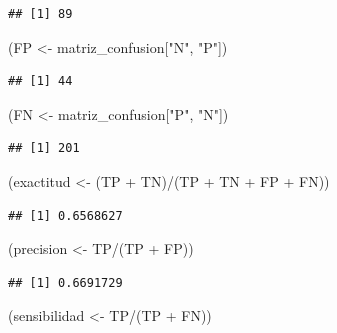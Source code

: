 \documentclass[
  12pt,
]{book}
\newenvironment{Shaded}{\begin{snugshade}}{\end{snugshade}}
\newcommand{\NormalTok}[1]{#1}
\newcommand{\OtherTok}[1]{\textcolor[rgb]{0.56,0.35,0.01}{#1}}
\newcommand{\SpecialCharTok}[1]{\textcolor[rgb]{0.00,0.00,0.00}{#1}}
\newcommand{\StringTok}[1]{\textcolor[rgb]{0.31,0.60,0.02}{#1}}
\theoremstyle{definition}
\theoremstyle{definition}
\theoremstyle{definition}
\theoremstyle{remark}
\begin{document}
\begin{verbatim}
## [1] 89
\end{verbatim}

\begin{Shaded}
\begin{Highlighting}[]
\NormalTok{(FP }\OtherTok{\textless{}{-}}\NormalTok{ matriz\_confusion[}\StringTok{"N"}\NormalTok{, }\StringTok{"P"}\NormalTok{])}
\end{Highlighting}
\end{Shaded}

\begin{verbatim}
## [1] 44
\end{verbatim}

\begin{Shaded}
\begin{Highlighting}[]
\NormalTok{(FN }\OtherTok{\textless{}{-}}\NormalTok{ matriz\_confusion[}\StringTok{"P"}\NormalTok{, }\StringTok{"N"}\NormalTok{])}
\end{Highlighting}
\end{Shaded}

\begin{verbatim}
## [1] 201
\end{verbatim}

\begin{Shaded}
\begin{Highlighting}[]
\NormalTok{(exactitud }\OtherTok{\textless{}{-}}\NormalTok{ (TP }\SpecialCharTok{+}\NormalTok{ TN)}\SpecialCharTok{/}\NormalTok{(TP }\SpecialCharTok{+}\NormalTok{ TN }\SpecialCharTok{+}\NormalTok{ FP }\SpecialCharTok{+}\NormalTok{ FN))}
\end{Highlighting}
\end{Shaded}

\begin{verbatim}
## [1] 0.6568627
\end{verbatim}

\begin{Shaded}
\begin{Highlighting}[]
\NormalTok{(precision }\OtherTok{\textless{}{-}}\NormalTok{ TP}\SpecialCharTok{/}\NormalTok{(TP }\SpecialCharTok{+}\NormalTok{ FP))}
\end{Highlighting}
\end{Shaded}

\begin{verbatim}
## [1] 0.6691729
\end{verbatim}

\begin{Shaded}
\begin{Highlighting}[]
\NormalTok{(sensibilidad }\OtherTok{\textless{}{-}}\NormalTok{ TP}\SpecialCharTok{/}\NormalTok{(TP }\SpecialCharTok{+}\NormalTok{ FN))}
\end{Highlighting}
\end{Shaded}
\end{document}
